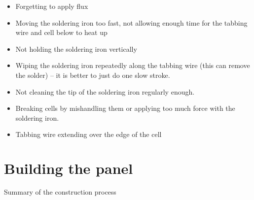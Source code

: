 \documentclass{article}
\theoremstyle{definition}
\theoremstyle{definition}
\theoremstyle{remark}
\begin{document}
    \begin{itemize}
      \item Forgetting to apply flux
      \item Moving the soldering iron too fast, not allowing enough time for the tabbing wire and cell below to heat up
      \item Not holding the soldering iron vertically
      \item Wiping the soldering iron repeatedly along the tabbing wire (this can remove the solder) – it is better to just do one slow stroke.
      \item Not cleaning the tip of the soldering iron regularly enough.
      \item Breaking cells by mishandling them or applying too much force with the soldering iron.
      \item Tabbing wire extending over the edge of the cell
    \end{itemize}
  


\newpage

{\color{blue}\section{Building the panel}} %
\label{sec:building_the_panel}

  Summary of the construction process
\end{document}
